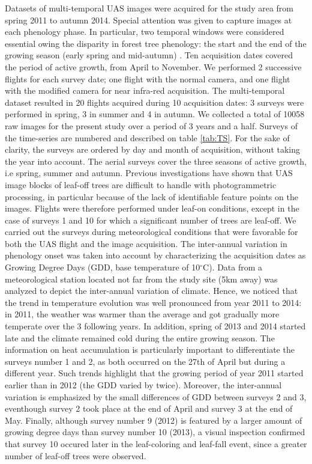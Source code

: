 \documentclass[remotesensing,article,submit,moreauthors,pdftex,12pt,a4paper]{mdpi} %
\begin{document}
Datasets of multi-temporal UAS images were acquired for the study area from spring 2011 to autumn 2014. 
Special attention was given to capture images at each phenology phase. 
In particular, two temporal windows were considered essential owing the disparity in forest tree phenology: the start and the end of the growing season (early spring and mid-autumn) \cite{hill_mapping_2010, key_comparison_2001}. 
Ten acquisition dates covered the period of active growth, from April to November. 
We performed 2 successive flights for each survey date; one flight with the normal camera, and one flight with the modified camera for near infra-red acquisition. 
The multi-temporal dataset resulted in 20 flights acquired during 10 acquisition dates: 3 surveys were performed in spring, 3 in summer and 4 in autumn. 
We collected a total of 10058 raw images for the present study over a period of 3 years and a half. 
Surveys of the time-series are numbered and described on table \ref{tab:TS}.
For the sake of clarity, the surveys are ordered by day and month of acquisition, without taking the year into account. 
The aerial surveys cover the three seasons of active growth, i.e spring, summer and autumn. Previous investigations have shown that UAS image blocks of leaf-off trees are difficult to handle with photogrammetric processing, in particular because of the lack of identifiable feature points on the images. 
Flights were therefore performed under leaf-on conditions, except in the case of surveys 1 and 10 for which a significant number of trees are leaf-off.
We carried out the surveys during meteorological conditions that were favorable for both the UAS flight and the image acquisition. %
The inter-annual variation in phenology onset was taken into account by characterizing the acquisition dates as Growing Degree Days (GDD, base temperature of 10$^{\circ}$C). 
Data from a meteorological station located not far from the study site (5km away) was analyzed to depict the inter-annual variation of climate. 
Hence, we noticed that the trend in temperature evolution was well pronounced from year 2011 to 2014: in 2011, the weather was warmer than the average and got gradually more temperate over the 3 following years. In addition, spring of 2013 and 2014 started late and the climate remained cold during the entire growing season. 
The information on heat accumulation is particularly important to differentiate the surveys number 1 and 2, as both occurred on the 27th of April but during a different year. 
Such trends highlight that the growing period of year 2011 started earlier than in 2012 (the GDD varied by twice). 
Moreover, the inter-annual variation is emphasized by the small differences of GDD between surveys 2 and 3, eventhough survey 2 took place at the end of April and survey 3 at the end of May. 
Finally, although survey number 9 (2012) is featured by a larger amount of growing degree days than survey number 10 (2013), a visual inspection confirmed that survey 10 occured later in the leaf-coloring and leaf-fall event, since a greater number of leaf-off trees were observed.
\end{document}
